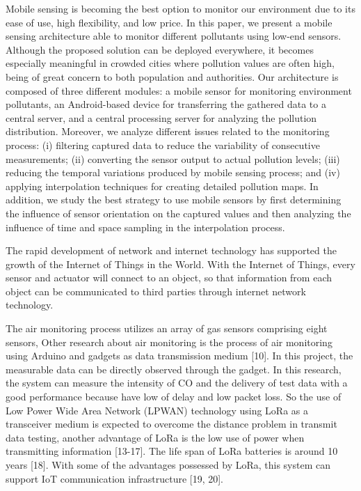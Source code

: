 %
Mobile sensing is becoming the best option to monitor our environment due to its ease of use,
	high flexibility,
	and low price.
In this paper,
	we present a mobile sensing architecture able to monitor different pollutants using low-end sensors.
Although the proposed solution can be deployed everywhere,
	it becomes especially meaningful in crowded cities where pollution values are often high,
	being of great concern to both population and authorities.
Our architecture is composed of three different modules:
	a mobile sensor for monitoring environment pollutants,
	an Android-based device for transferring the gathered data to a central server,
	and a central processing server for analyzing the pollution distribution.
Moreover,
	we analyze different issues related to the monitoring process:
	(i) filtering captured data to reduce the variability of consecutive measurements;
	(ii) converting the sensor output to actual pollution levels;
	(iii) reducing the temporal variations produced by mobile sensing process;
	and (iv) applying interpolation techniques for creating detailed pollution maps.
In addition,
	we study the best strategy to use mobile sensors by first determining the influence of sensor orientation on the captured values and then analyzing the influence of time and space sampling in the interpolation process.






%

The rapid development of network and internet technology has supported the growth of the Internet of Things in the World.
With the Internet of Things,
	every sensor and actuator will connect to an object,
	so that information from each object can be communicated to third parties through internet network technology.

The air monitoring process utilizes an array of gas sensors comprising eight sensors,
Other research about air monitoring is the process of air monitoring using Arduino and gadgets as data transmission medium [10].
In this project,
	the measurable data can be directly observed through the gadget.
In this research,
	the system can measure the intensity of CO and the delivery of test data with a good performance because have low of delay and low packet loss.
So the use of Low Power Wide Area Network (LPWAN) technology using LoRa as a transceiver medium is expected to overcome the distance problem in transmit data testing,
	another advantage of LoRa is the low use of power when transmitting information [13-17].
The life span of LoRa batteries is around 10 years [18].
With some of the advantages possessed by LoRa,
	this system can support IoT communication infrastructure [19, 20].





